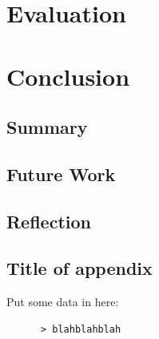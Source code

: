 \documentclass{l4proj}
\begin{document}

\chapter{Evaluation}



\chapter{Conclusion}
\section{Summary}
\section{Future Work}
\section{Reflection}

























\begin{appendices}

\chapter{Title of appendix}
Put some data in here:
\begin{verbatim}
      > blahblahblah
\end{verbatim}

\end{appendices}




\end{document}
